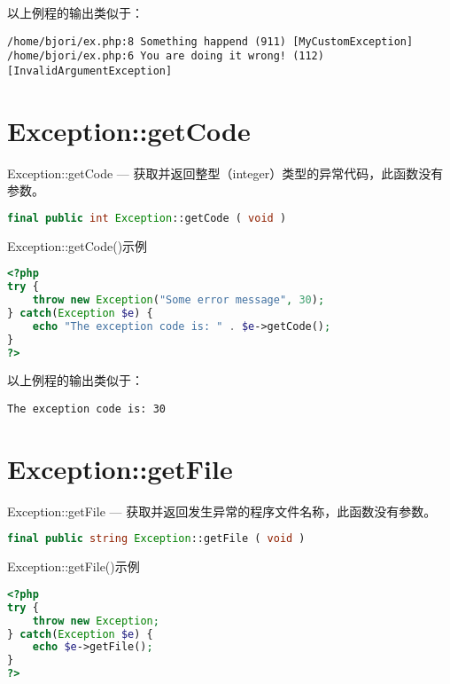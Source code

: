 以上例程的输出类似于：

\begin{verbatim}
/home/bjori/ex.php:8 Something happend (911) [MyCustomException]
/home/bjori/ex.php:6 You are doing it wrong! (112) [InvalidArgumentException]
\end{verbatim}




\section{Exception::getCode}


Exception::getCode — 获取并返回整型（integer）类型的异常代码，此函数没有参数。


\begin{lstlisting}[language=PHP]
final public int Exception::getCode ( void )
\end{lstlisting}



\begin{example}
Exception::getCode()示例
\begin{lstlisting}[language=PHP]
<?php
try {
    throw new Exception("Some error message", 30);
} catch(Exception $e) {
    echo "The exception code is: " . $e->getCode();
}
?>
\end{lstlisting}
\end{example}

以上例程的输出类似于：


\begin{verbatim}
The exception code is: 30
\end{verbatim}

\section{Exception::getFile}


Exception::getFile — 获取并返回发生异常的程序文件名称，此函数没有参数。

\begin{lstlisting}[language=PHP]
final public string Exception::getFile ( void )
\end{lstlisting}



\begin{example}
Exception::getFile()示例
\begin{lstlisting}[language=PHP]
<?php
try {
    throw new Exception;
} catch(Exception $e) {
    echo $e->getFile();
}
?>
\end{lstlisting}
\end{example}

